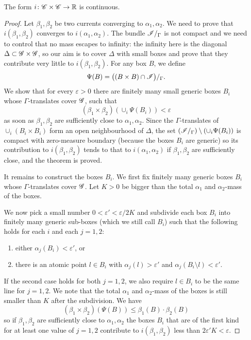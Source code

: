 \begin{teo}
The form $i\colon \mathscr{C} \times \mathscr{C} \to \mathbb{R}$ is continuous.
\end{teo}
\begin{proof}
Let $\beta_1, \beta_2$ be two currents converging to $\alpha_1, \alpha_2$. We need to prove that $i(\beta_1,\beta_2)$ converges to $i(\alpha_1, \alpha_2)$. The bundle $\mathscr{I}/_\Gamma$ is not compact and we need to control that no mass escapes to infinity: the infinity here is the diagonal $\Delta \subset \mathscr{G} \times \mathscr{G}$, so our aim is to cover $\Delta$ with small boxes and prove that they contribute very little to $i(\beta_1,\beta_2)$. For any box $B$, we define
$$\Psi(B) = \big((B\times B)\cap \mathscr{I} \big)/_\Gamma.$$
We show that for every $\varepsilon >0$ there are finitely many small generic boxes $B_i$ whose $\Gamma$-translates cover $\mathscr{G}$, such that 
$$(\beta_1 \times \beta_2) (\cup_i\Psi(B_i)) < \varepsilon$$
as soon as $\beta_1,\beta_2$ are sufficiently close to $\alpha_1,\alpha_2$. Since the $\Gamma$-translates of $\cup_i (B_i\times B_i)$ form an open neighbourhood of $\Delta$, the set $(\mathscr{I}/_\Gamma )\setminus (\cup_i \Psi(B_i))$ is compact with zero-measure boundary (because the boxes $B_i$ are generic) so its contribution to $i(\beta_1, \beta_2)$ tends to that to $i(\alpha_1,\alpha_2)$ if $\beta_1,\beta_2$ are sufficiently close, and the theorem is proved.

It remains to construct the boxes $B_i$. We first fix finitely many generic boxes $B_i$ whose $\Gamma$-translates cover $\mathscr{G}$. Let $K>0$ be bigger than the total $\alpha_1$ and $\alpha_2$-mass of the boxes. 

We now pick a small number $0<\varepsilon' < \varepsilon / 2K$ and subdivide each box $B_i$ into finitely many generic sub-boxes (which we still call $B_i$) such that the following holds for each $i$ and each $j=1,2$:
\begin{enumerate}
\item either $\alpha_j(B_i) < \varepsilon'$, or
\item there is an atomic point $l \in B_i$ with $\alpha_j(l) > \varepsilon'$ and $\alpha_j(B_i \setminus l) < \varepsilon'$.
\end{enumerate}
If the second case holds for both $j=1,2$, we also require $l\in B_i$ to be the same line for $j=1,2$.
We note that the total $\alpha_1$ and $\alpha_2$-mass of the boxes is still smaller than $K$ after the subdivision.
We have
$$(\beta_1 \times \beta_2)(\Psi(B)) \leqslant \beta_1(B) \cdot \beta_2(B)$$
so if $\beta_1,\beta_2$ are sufficiently close to $\alpha_1, \alpha_2$ the boxes $B_i$ that are of the first kind for at least one value of $j=1,2$ contribute to $i(\beta_1, \beta_2)$ less than $2\varepsilon' K<\varepsilon$.


\end{proof}

